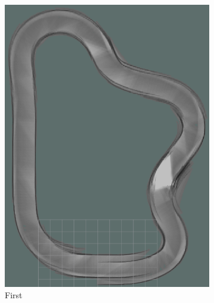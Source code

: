 \begin{figure} 
	\centering
	\begin{subfigure}{.3\linewidth}
		\includegraphics[width=\textwidth]{Pictures/1slamtest1}
		\caption{First}
		\end{subfigure}	
	\begin{subfigure}{.3\linewidth}

\end{subfigure}
\end{figure}
